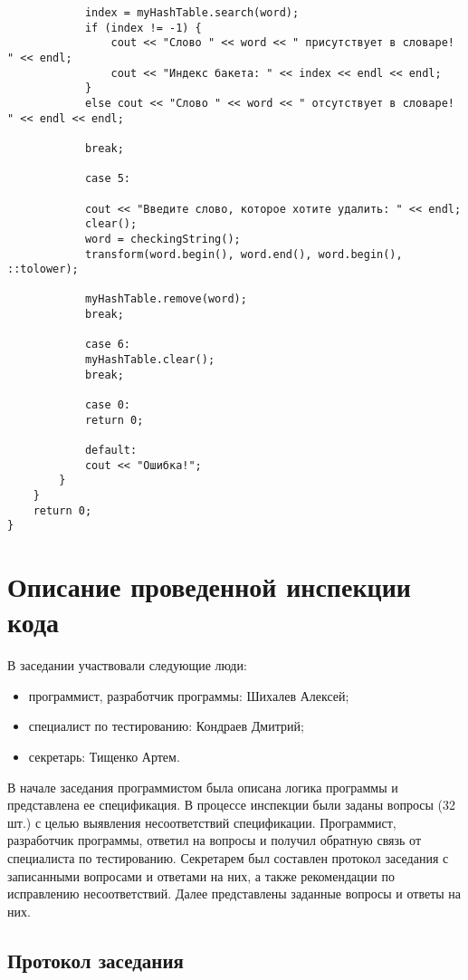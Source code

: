 \documentclass[11pt,a4paper,final]{article} %
\begin{document}
\begin{lstlisting}
			index = myHashTable.search(word);
			if (index != -1) {
				cout << "Слово " << word << " присутствует в словаре! " << endl;
				cout << "Индекс бакета: " << index << endl << endl;
			}
			else cout << "Слово " << word << " отсутствует в словаре! " << endl << endl;
			
			break;
			
			case 5:
			
			cout << "Введите слово, которое хотите удалить: " << endl;
			clear();
			word = checkingString();
			transform(word.begin(), word.end(), word.begin(), ::tolower);
			
			myHashTable.remove(word);
			break;
			
			case 6:
			myHashTable.clear();
			break;
			
			case 0:
			return 0;
			
			default:
			cout << "Ошибка!";
		}
	}
	return 0;
}

\end{lstlisting}


\newpage
\section{Описание проведенной инспекции кода}

В заседании участвовали следующие люди: 
\begin{itemize}
	\item программист, разработчик программы: Шихалев Алексей;
	\item специалист по тестированию: Кондраев Дмитрий;
	\item секретарь: Тищенко Артем.
\end{itemize}

В начале заседания программистом была описана логика программы и представлена ее спецификация. В процессе инспекции были заданы вопросы (32 шт.) с целью выявления несоответствий спецификации. Программист, разработчик программы, ответил на вопросы и получил обратную связь от специалиста по тестированию. Секретарем был составлен протокол заседания с записанными вопросами и ответами на них, а также рекомендации по исправлению несоответствий. Далее представлены заданные вопросы и ответы на них.


\subsection{Протокол заседания}
\end{document}
